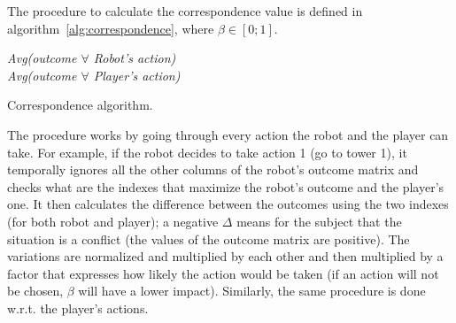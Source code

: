 The procedure to calculate the correspondence value is defined in algorithm~\ref{alg:correspondence}, where $\beta \in[0;1]$.
\begin{algorithm}[h]
\SetAlgoLined
{}
\BlankLine
\textit{Avg(outcome $\forall$ Robot's action)}\\
\textit{Avg(outcome $\forall$ Player's action)}\\

\caption{Correspondence algorithm.}
\label{alg:correspondence}
\end{algorithm}
The procedure works by going through every action the robot and the player can take. For example, if the robot decides to take action 1 (go to tower 1), it temporally ignores all the other columns of the robot's outcome matrix and checks what are the indexes that maximize the robot's outcome and the player's one. It then calculates the difference between the outcomes using the two indexes (for both robot and player); a negative $\Delta$ means for the subject that the situation is a conflict (the values of the outcome matrix are positive). The variations are normalized and multiplied by each other and then multiplied by a factor that expresses how likely the action would be taken (if an action will not be chosen, $\beta$ will have a lower impact). Similarly, the same procedure is done w.r.t. the player's actions.

